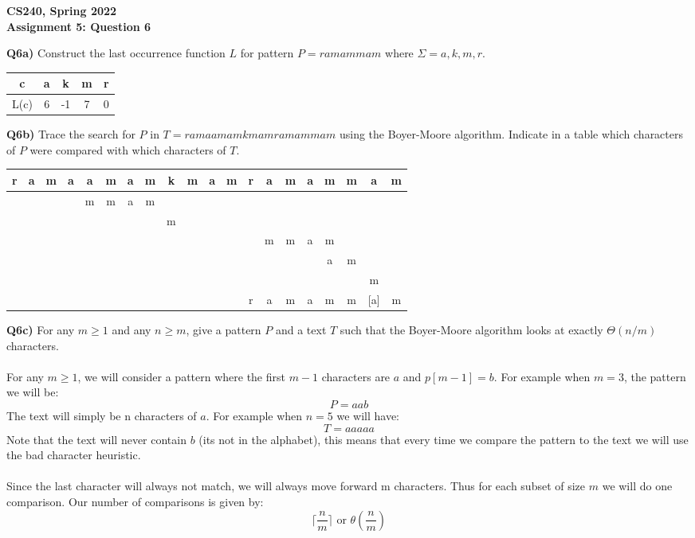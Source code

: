 \documentclass[12pt]{article}
\begin{document}
\begin{center}
{\Large\textbf{CS240, Spring 2022}}\\
\vspace{2mm}
{\Large\textbf{Assignment 5: Question 6}}\\
\vspace{3mm}
\end{center}

\begin{adjustwidth}{0em}{0pt}
\textbf{Q6a)} Construct the last occurrence function $L$ for pattern $P=ramammam$ where $\Sigma = {a,k,m,r}$.

\begin{center}
	\begin{tabular}{|c|c|c|c|c|} \hline
		c &  a &  k &  m &  r  \\ \hline
		L(c)&6  & -1  & 7  & 0   \\ \hline
	\end{tabular}
\end{center}
\textbf{Q6b)} Trace the search for $P$ in $T=ramaamamkmamramammam$ using the Boyer-Moore algorithm. Indicate in a table which characters of $P$ were compared with which characters of $T$.

\begin{center}
	\begin{tabular}{|c|c|c|c|c|c|c|c|c|c|c|c|c|c|c|c|c|c|c|c|}
		\hline
		r&a&m&a&a&m&a&m&k&m&a&m&r&a&m&a&m&m&a&m\\
		\hline
		\hline
	    &&&&m&m&a&m&&&&&&&&&&&&\\
	    \hline
		&&&&&&&&m&&&&&&&&&&&\\
		\hline
		&&&&&&&&&&&&&m&m&a&m&&&\\
		\hline
		&&&&&&&&&&&&&&&&a&m&&\\
		\hline
		&&&&&&&&&&&&&&&&&&m&\\
		\hline
		&&&&&&&&&&&&r&a&m&a&m&m&[a]&m\\
		\hline
	\end{tabular}
\end{center}
\textbf{Q6c)} For any $m\geq 1$ and any $n\geq m$, give a pattern $P$ and a text $T$ such that the Boyer-Moore algorithm looks at exactly $\Theta(n/m)$ characters. \\\\
For any $m\geq 1$, we will consider a pattern where the first $m-1$ characters are $a$ and $p[m-1] = b.$ For example when $m=3$, the pattern we will be:
\[ P = aab \]
The text will simply be n characters of $a$. For example when $n=5$ we will have:
\[ T = aaaaa \]
Note that the text will never contain $b$ (its not in the alphabet), this means that every time we compare the pattern to the text we will use the bad character heuristic. \\\\ Since the last character will always not match, we will always move forward m characters. Thus for each subset of size $m$ we will do one comparison. Our number of comparisons is given by:
\[ \lceil\frac{n}{m}\rceil \text{ or } \theta(\frac{n}{m}) \]
\end{adjustwidth}
\end{document}
